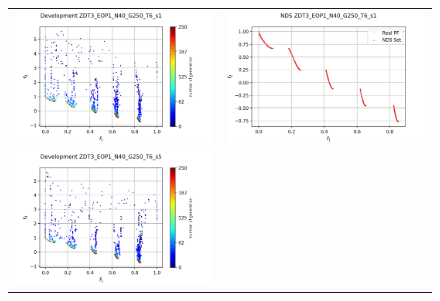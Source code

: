 \begin{figure}[H]
    \centering
    \begin{tabular}{c c}
    \includegraphics[scale=0.5]{figures/ZDT3_EOP1_N40_G250_T6/s1_dev.png} &
    \includegraphics[scale=0.5]{figures/ZDT3_EOP1_N40_G250_T6/s1_nds.png}\\
    \includegraphics[scale=0.5]{figures/ZDT3_EOP1_N40_G250_T6/s5_dev.png} &

\end{tabular}
\end{figure}
